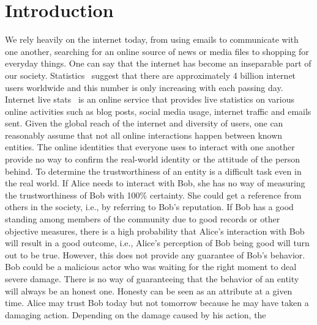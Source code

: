 \chapter{Introduction}\label{ch:intro}
We rely heavily on the internet today, from using emails to communicate with
one another, searching for an online source of news or media files to shopping
for everyday things. One can say that the internet has become an inseparable
part of our society. Statistics~\cite{InternetWorldStat} suggest that there are
approximately 4 billion internet users worldwide and this number is only
increasing with each passing day. Internet live stats~\cite{InternetLiveStat}
is an online service that provides live statistics on various online activities
such as blog posts, social media usage, internet traffic and emails sent. Given
the global reach of the internet and diversity of users, one can reasonably
assume that not all online interactions happen between known entities. The
online identities that everyone uses to interact with one another provide no
way to confirm the real-world identity or the attitude of the person behind. To
determine the trustworthiness of an entity is a difficult task even in the real
world. If Alice needs to interact with Bob, she has no way of measuring the
trustworthiness of Bob with 100\% certainty. She could get a reference from
others in the society, i.e., by referring to Bob's reputation. If Bob has a
good standing among members of the community due to good records or other
objective measures, there is a high probability that Alice's interaction with
Bob will result in a good outcome, i.e., Alice's perception of Bob being good
will turn out to be true. However, this does not provide any guarantee of Bob's
behavior. Bob could be a malicious actor who was waiting for the right moment
to deal severe damage. There is no way of guaranteeing that the behavior of an
entity will always be an honest one. Honesty can be seen as an attribute at a
given time. Alice may trust Bob today but not tomorrow because he may have
taken a damaging action. Depending on the damage caused by his action, the
